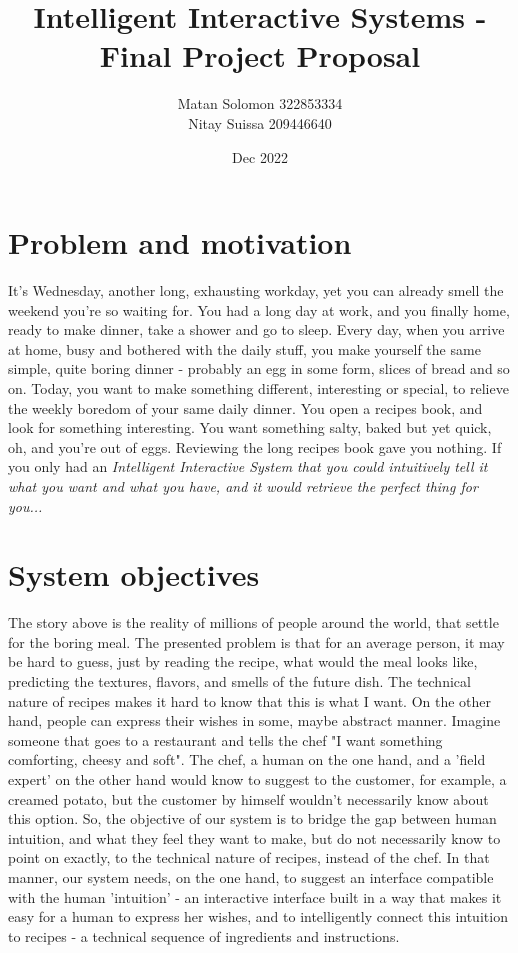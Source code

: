 \documentclass[]{article}
\title{\vspace{-2cm}Intelligent Interactive Systems - Final Project Proposal}
\author{Matan Solomon 322853334 \\ Nitay Suissa 209446640}
\date{Dec 2022}
\begin{document}
\maketitle
\section{Problem and motivation}
It's Wednesday, another long, exhausting workday, yet you can already smell the weekend you're so waiting for. You had a long day at work, and you finally home, ready to make dinner, take a shower and go to sleep.  Every day, when you arrive at home, busy and bothered with the daily stuff, you make yourself the same simple, quite boring dinner - probably an egg in some form, slices of bread and so on. Today, you want to make something different, interesting or special, to relieve the weekly boredom of your same daily dinner. You open a recipes book, and look for something interesting. You want something salty, baked but yet quick, oh, and you're out of eggs. Reviewing the long recipes book gave you nothing. If you only had an \textit{Intelligent Interactive System that you could intuitively tell it what you want and what you have, and it would retrieve the perfect thing for you...}

\section{System objectives}
The story above is the reality of millions of people around the world, that settle for the boring meal. The presented problem is that for an average person, it may be hard to guess, just by reading the recipe, what would the meal looks like, predicting the textures, flavors, and smells of the future dish. The technical nature of recipes makes it hard to know that this is what I want. On the other hand, people can express their wishes in some, maybe abstract manner. Imagine someone that goes to a restaurant and tells the chef "I want something comforting, cheesy and soft". The chef, a human on the one hand, and a 'field expert' on the other hand would know to suggest to the customer, for example, a creamed potato, but the customer by himself wouldn't necessarily know about this option. So, the objective of our system is to bridge the gap between human intuition, and what they feel they want to make, but do not necessarily know to point on exactly, to the technical nature of recipes, instead of the chef. In that manner, our system needs, on the one hand, to suggest an interface compatible with the human 'intuition' - an interactive interface built in a way that makes it easy for a human to express her wishes, and to intelligently connect this intuition to recipes - a technical sequence of ingredients and instructions.
\end{document}
